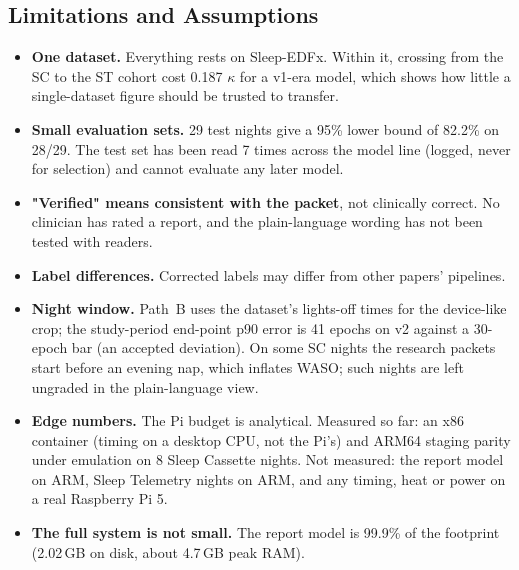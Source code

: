 \subsection{Limitations and Assumptions}

\begin{itemize}
  \item \textbf{One dataset.} Everything rests on Sleep-EDFx. Within it, crossing from the SC to the ST cohort cost
  0.187 $\kappa$ for a v1-era model, which shows how little a single-dataset figure should be trusted to transfer.
  \item \textbf{Small evaluation sets.} 29 test nights give a 95\% lower bound of 82.2\% on 28/29. The test set has
  been read 7 times across the model line (logged, never for selection) and cannot evaluate any later model.
  \item \textbf{"Verified" means consistent with the packet}, not clinically correct. No clinician has rated a
  report, and the plain-language wording has not been tested with readers.
  \item \textbf{Label differences.} Corrected labels may differ from other papers' pipelines.
  \item \textbf{Night window.} Path~B uses the dataset's lights-off times for the device-like crop; the study-period
  end-point p90 error is 41 epochs on v2 against a 30-epoch bar (an accepted deviation). On some SC nights the
  research packets start before an evening nap, which inflates WASO; such nights are left ungraded in the
  plain-language view.
  \item \textbf{Edge numbers.} The Pi budget is analytical. Measured so far: an x86 container (timing on a desktop CPU,
  not the Pi's) and ARM64 staging parity under emulation on 8 Sleep Cassette nights. Not measured: the report model on
  ARM, Sleep Telemetry nights on ARM, and any timing, heat or power on a real Raspberry Pi 5.
  \item \textbf{The full system is not small.} The report model is 99.9\% of the footprint (2.02\,GB on disk, about
  4.7\,GB peak RAM).
\end{itemize}
